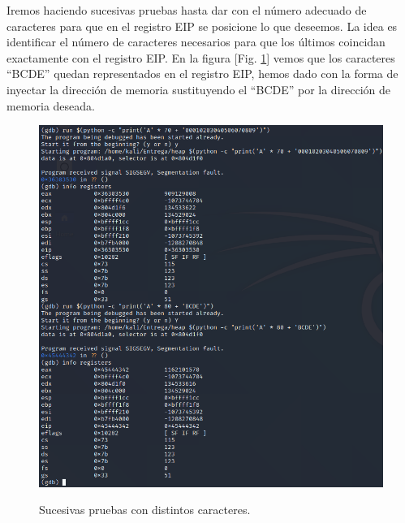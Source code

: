 \documentclass[10pt,a4paper]{article}
\begin{document}
Iremos haciendo sucesivas pruebas hasta dar con el número adecuado de caracteres para que en el registro EIP se posicione lo que deseemos. La idea es identificar el número de caracteres necesarios para que los últimos coincidan exactamente con el registro EIP. En la figura [Fig. \ref{fig:figura6}] vemos que los caracteres ``BCDE'' quedan representados en el registro EIP, hemos dado con la forma de inyectar la dirección de memoria sustituyendo el  ``BCDE'' por la dirección de memoria deseada.
\begin{figure}[h!]
  \centering
  \includegraphics[scale=0.4]{5.png}\\
  \caption{Sucesivas pruebas con distintos caracteres.}
  \label{fig:figura6}
\end{figure}

\pagebreak
\end{document}
